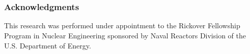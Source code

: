 \documentclass[compress,xcolor=table]{beamer}
\begin{document}
\section*{}
\begin{frame}
\frametitle{Acknowledgments}

This research was performed under appointment to the Rickover Fellowship Program in Nuclear Engineering sponsored by Naval Reactors Division of the U.S. Department of Energy.

\end{frame}
%
%
%
\end{document}
